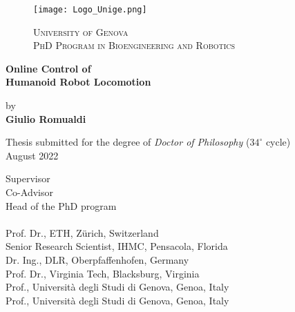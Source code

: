 
\thispagestyle{empty}
\begin{figure}[h!]
 \centering
 \texttt{[image: Logo\_Unige.png]}  %
	\begin{center} 
		\Large
		{\textsc{University of Genova}}\\
		  \vspace{0.5em}
		  \large
	         \textsc{PhD Program in Bioengineering and Robotics}\\
	\end{center}
\end{figure}



\begin{center} 
	


		\LARGE
		\textbf{Online Control of\\Humanoid Robot Locomotion} \\
\end{center}

 	\begin{center} 
		by \\
		\vspace{0.5em}
		\textbf{Giulio Romualdi}\\
		\vspace{1em}
	
		
	\vspace{1cm}	
		\normalsize
		Thesis submitted for the degree of \textit{Doctor of Philosophy} ($34^\circ$ cycle) \\
	\vspace{1cm}	
		\normalsize
		August 2022\\ 
	\end{center}
	\vspace{2em}

 \vfill


	 \hfill  {Supervisor}	
	\\
	 \hfill  {Co-Advisor}	
	\\
		\hfill  {Head of the PhD program}	
	\vspace{1em} \\
	\\
		\hfill  {Prof. Dr., ETH, Zürich, Switzerland} \\
		\hfill  {Senior Research Scientist, IHMC, Pensacola, Florida}\\
		\hfill  {Dr. Ing., DLR, Oberpfaffenhofen, Germany} \\
		\hfill  {Prof. Dr., Virginia Tech, Blacksburg, Virginia} \\
		\hfill  {Prof., Università degli Studi di Genova, Genoa, Italy} \\
		\hfill  {Prof., Università degli Studi di Genova, Genoa, Italy}

